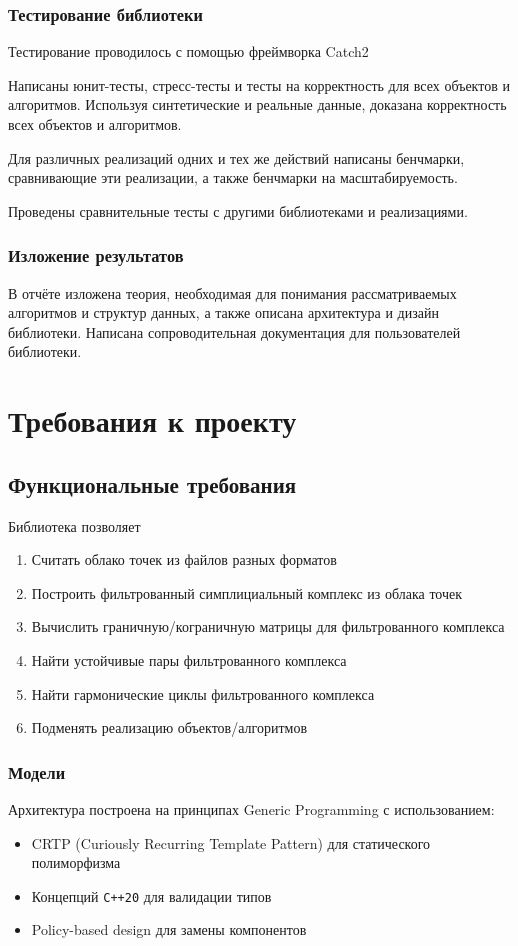 \documentclass{article}
\begin{document}
\subsubsection*{Тестирование библиотеки}
Тестирование проводилось с помощью фреймворка Catch2 \autocite{catch2}

Написаны юнит-тесты, стресс-тесты и тесты на корректность для всех объектов и алгоритмов. Используя синтетические и реальные данные, доказана корректность всех объектов и алгоритмов.

Для различных реализаций одних и тех же действий написаны бенчмарки, сравнивающие эти реализации, а также бенчмарки на масштабируемость.

Проведены сравнительные тесты с другими библиотеками и реализациями.

\subsubsection*{Изложение результатов}
В отчёте изложена теория, необходимая для понимания рассматриваемых алгоритмов и структур данных, а также описана архитектура и дизайн библиотеки. Написана сопроводительная документация для пользователей библиотеки.

\section{Требования к проекту}
\subsection{Функциональные требования}
Библиотека позволяет
\begin{enumerate}
  \item Считать облако точек из файлов разных форматов
  \item Построить фильтрованный симплициальный комплекс из облака точек
  \item Вычислить граничную/кограничную матрицы для фильтрованного комплекса
  \item Найти устойчивые пары фильтрованного комплекса
  \item Найти гармонические циклы фильтрованного комплекса
  \item Подменять реализацию объектов/алгоритмов
\end{enumerate}

\subsubsection{Модели}
Архитектура построена на принципах Generic Programming с использованием:
\begin{itemize}
  \item CRTP (Curiously Recurring Template Pattern) для статического полиморфизма
  \item Концепций \texttt{C++20} для валидации типов
  \item Policy-based design для замены компонентов
\end{itemize}
\end{document}
